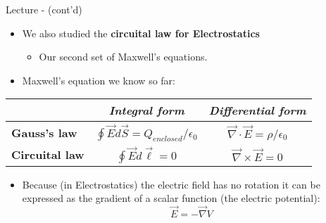 \begin{frame}{Lecture \summarizedlecture - \lecturesummarytitle (cont'd)}

\begin{itemize}
  \item We also studied the {\bf circuital law for Electrostatics}
     \begin{itemize}
        \item Our second set of Maxwell's equations.
     \end{itemize}
  \vspace{0.2cm}
  \item Maxwell's equation we know so far:
\end{itemize}

\begin{center}
 {
  \begin{table}[H]
    \begin{tabular}{|l|c|c|}
      \hline
          & {\it Integral form} & {\it Differential form} \\
      \hline
      {\bf Gauss's law} &
        $\oint \vec{E} d\vec{S} = Q_{enclosed} / \epsilon_0$ &
        $\vec{\nabla} \cdot \vec{E} = \rho / \epsilon_0$ \\

      {\bf Circuital law} &
        $\oint \vec{E} d\vec{\ell} = 0$ &
        $\vec{\nabla} \times \vec{E} = 0$ \\
      \hline
    \end{tabular}
  \end{table}
 }
\end{center}

\begin{itemize}
  \item Because (in Electrostatics) the electric field has no rotation
        it can be expressed as the gradient of a scalar function (the electric potential):
        \begin{equation*}
           \vec{E} = - \vec{\nabla} V
        \end{equation*}
\end{itemize}


\end{frame}

%
%
%

